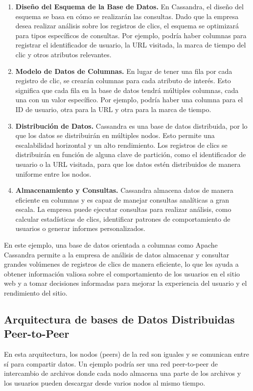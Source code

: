 \begin{enumerate}
	\item \textbf{Diseño del Esquema de la Base de Datos.} En Cassandra, el diseño del esquema se basa en cómo se realizarán las consultas. Dado que la empresa desea realizar análisis sobre los registros de clics, el esquema se optimizará para tipos específicos de consultas. Por ejemplo, podría haber columnas para registrar el identificador de usuario, la URL visitada, la marca de tiempo del clic y otros atributos relevantes.
	\item \textbf{Modelo de Datos de Columnas.} En lugar de tener una fila por cada registro de clic, se crearán columnas para cada atributo de interés. Esto significa que cada fila en la base de datos tendrá múltiples columnas, cada una con un valor específico. Por ejemplo, podría haber una columna para el ID de usuario, otra para la URL y otra para la marca de tiempo.
	\item \textbf{Distribución de Datos.} Cassandra es una base de datos distribuida, por lo que los datos se distribuirán en múltiples nodos. Esto permite una escalabilidad horizontal y un alto rendimiento. Los registros de clics se distribuirán en función de alguna clave de partición, como el identificador de usuario o la URL visitada, para que los datos estén distribuidos de manera uniforme entre los nodos.
	\item \textbf{Almacenamiento y Consultas.} Cassandra almacena datos de manera eficiente en columnas y es capaz de manejar consultas analíticas a gran escala. La empresa puede ejecutar consultas para realizar análisis, como calcular estadísticas de clics, identificar patrones de comportamiento de usuarios o generar informes personalizados.
\end{enumerate}
En este ejemplo, una base de datos orientada a columnas como Apache Cassandra permite a la empresa de análisis de datos almacenar y consultar grandes volúmenes de registros de clics de manera eficiente, lo que les ayuda a obtener información valiosa sobre el comportamiento de los usuarios en el sitio web y a tomar decisiones informadas para mejorar la experiencia del usuario y el rendimiento del sitio.

\subsection{Arquitectura de bases de Datos Distribuidas Peer-to-Peer}
\noindent
En esta arquitectura, los nodos (peers) de la red son iguales y se comunican entre sí para compartir datos. Un ejemplo podría ser una red peer-to-peer de intercambio de archivos donde cada nodo almacena una parte de los archivos y los usuarios pueden descargar desde varios nodos al mismo tiempo.

